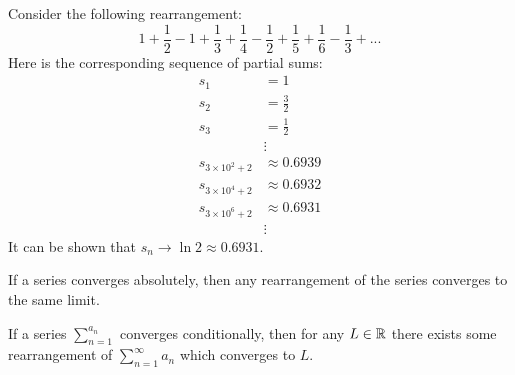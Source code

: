 \begin{remark}
    Consider the following rearrangement:
    $$1+\frac{1}{2} -1 + \frac{1}{3} + \frac{1}{4} - \frac{1}{2} + \frac{1}{5} + \frac{1}{6} - \frac{1}{3} +...$$
    Here is the corresponding sequence of partial sums:
    \begin{align*}
        s_1 &= 1 \\
        s_2 &= \frac{3}{2} \\
        s_3 &= \frac{1}{2} \\
        &\vdots \\
        s_{3\times 10^2 + 2} &\approx 0.6939 \\
        s_{3\times 10^4 + 2} &\approx 0.6932 \\
        s_{3\times 10^6 + 2} &\approx 0.6931 \\
        &\vdots
    \end{align*}
    It can be shown that $s_n \to \ln 2 \approx 0.6931$.
\end{remark}

\begin{theorem}
    If a series converges absolutely, then any rearrangement of the series converges to the same limit.
\end{theorem}

\begin{theorem}
    If a series $\sum_{n=1}^{a_n}$ converges conditionally, then for any $L \in \mathbb{R}$ there exists some rearrangement of $\sum_{n=1}^{\infty}a_n$ which converges to $L$.
\end{theorem}